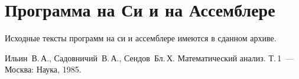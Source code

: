\documentclass[a4paper,12pt,titlepage,finall]{article}
\begin{document}
\section{Программа на Си и на Ассемблере}
Исходные тексты программ на си и ассемблере имеются в сданном архиве.
\newpage
\begin{raggedright}
\begin{thebibliography}{99}
 Ильин~В.\,А., Садовничий~В.\,А., Сендов~Бл.\,Х. Математический анализ. Т.\,1~---
    Москва: Наука, 1985.
\end{thebibliography}
\end{raggedright}
\end{document}
